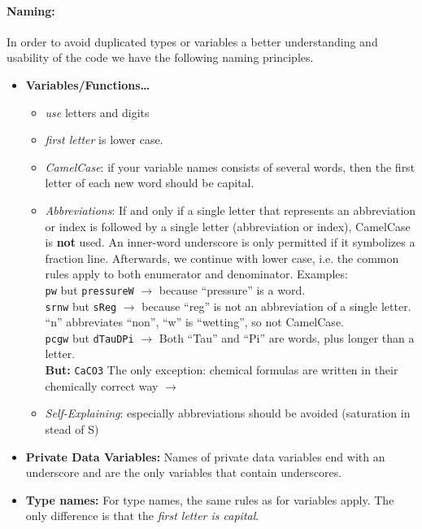 \paragraph{Naming:}
In order to avoid duplicated types or variables a better understanding and usability
of the code we have the following naming principles.
\begin{itemize}
\item \textbf{Variables/Functions\ldots}
  \begin{itemize}
  \item \emph{use} letters and digits
  \item \emph{first letter} is lower case.
  \item \emph{CamelCase}: if your variable names consists of several words, then
        the first letter of each new word should be capital.
  \item \emph{Abbreviations}: If and only if a single letter that represents an
         abbreviation or index is followed by a single letter (abbreviation or index),
         CamelCase is {\bf not} used. An inner-word underscore is only permitted if
         it symbolizes a fraction line. Afterwards, we continue with lower case, i.e.
         the common rules apply to both enumerator and denominator. Examples: \\
         \texttt{pw} but \texttt{pressureW} $\rightarrow$ because ``pressure'' is a word.\\
         \texttt{srnw} but \texttt{sReg} $\rightarrow$ because ``reg'' is not an
         abbreviation of a single letter. ``n'' abbreviates ``non'', ``w'' is ``wetting'', so not CamelCase.\\
         \texttt{pcgw} but \texttt{dTauDPi} $\rightarrow$ Both ``Tau'' and ``Pi''
         are words, plus longer than a letter.\\
         \textbf{But:} \texttt{CaCO3} The only exception: chemical formulas are
         written in their chemically correct way $\rightarrow$
  \item \emph{Self-Explaining}: especially abbreviations should be avoided (saturation in stead of S)
  \end{itemize}
\item \textbf{Private Data Variables:} Names of private data variables end with an
      underscore and are the only variables that contain underscores.
\item \textbf{Type names:} For type names, the same rules as for variables apply. The
      only difference is that the \emph{first letter is capital}.

\end{itemize}
